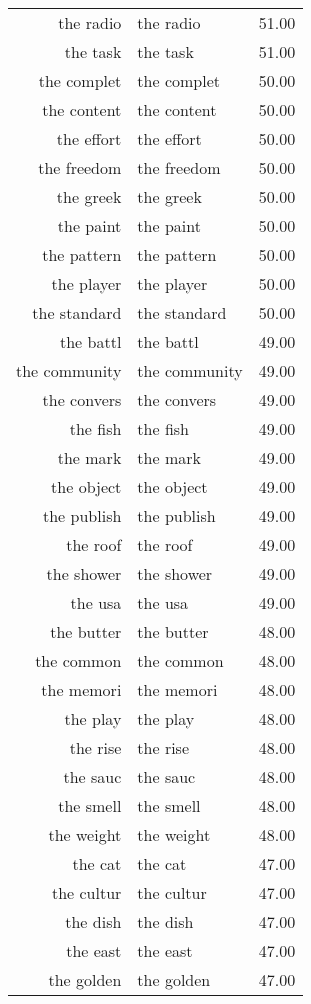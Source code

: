 \begin{table}[ht]
\begin{tabular}{rlr}
  the radio & the radio & 51.00 \\ 
  the task & the task & 51.00 \\ 
  the complet & the complet & 50.00 \\ 
  the content & the content & 50.00 \\ 
  the effort & the effort & 50.00 \\ 
  the freedom & the freedom & 50.00 \\ 
  the greek & the greek & 50.00 \\ 
  the paint & the paint & 50.00 \\ 
  the pattern & the pattern & 50.00 \\ 
  the player & the player & 50.00 \\ 
  the standard & the standard & 50.00 \\ 
  the battl & the battl & 49.00 \\ 
  the community & the community & 49.00 \\ 
  the convers & the convers & 49.00 \\ 
  the fish & the fish & 49.00 \\ 
  the mark & the mark & 49.00 \\ 
  the object & the object & 49.00 \\ 
  the publish & the publish & 49.00 \\ 
  the roof & the roof & 49.00 \\ 
  the shower & the shower & 49.00 \\ 
  the usa & the usa & 49.00 \\ 
  the butter & the butter & 48.00 \\ 
  the common & the common & 48.00 \\ 
  the memori & the memori & 48.00 \\ 
  the play & the play & 48.00 \\ 
  the rise & the rise & 48.00 \\ 
  the sauc & the sauc & 48.00 \\ 
  the smell & the smell & 48.00 \\ 
  the weight & the weight & 48.00 \\ 
  the cat & the cat & 47.00 \\ 
  the cultur & the cultur & 47.00 \\ 
  the dish & the dish & 47.00 \\ 
  the east & the east & 47.00 \\ 
  the golden & the golden & 47.00 \\ 

\end{tabular}
\end{table}
